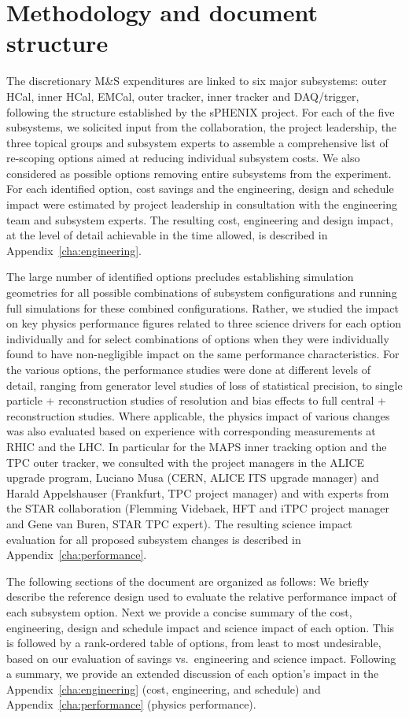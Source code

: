 \section{Methodology and document structure}

The discretionary M\&S expenditures are linked to six major
subsystems: outer HCal, inner HCal, EMCal, outer tracker, inner
tracker and DAQ/trigger, following the structure established by the
sPHENIX project. For each of the five subsystems, we solicited input
from the collaboration, the project leadership, the three topical
groups and subsystem experts to assemble a comprehensive list of
re-scoping options aimed at reducing individual subsystem costs.  We
also considered as possible options removing entire subsystems from
the experiment. For each identified option, cost savings and the
engineering, design and schedule impact were estimated by project
leadership in consultation with the engineering team and subsystem
experts. The resulting cost, engineering and design impact, at the
level of detail achievable in the time allowed, is described in
Appendix~\ref{cha:engineering}.

The large number of identified options precludes establishing
simulation geometries for all possible combinations of subsystem
configurations and running full \geant simulations for these combined
configurations. Rather, we studied the impact on key physics
performance figures related to three science drivers for each option
individually and for select combinations of options when they were
individually found to have non-negligible impact on the same
performance characteristics. For the various options, the performance
studies were done at different levels of detail, ranging from
generator level studies of loss of statistical precision, to single
particle \geant + reconstruction studies of resolution and bias
effects to full central \auau \hijing \geant + reconstruction
studies. Where applicable, the physics impact of various changes was
also evaluated based on experience with corresponding measurements at
RHIC and the LHC. In particular for the MAPS inner tracking option and
the TPC outer tracker, we consulted with the project managers in the
ALICE upgrade program, Luciano Musa (CERN, ALICE ITS upgrade manager)
and Harald Appelshauser (Frankfurt, TPC project manager) and with
experts from the STAR collaboration (Flemming Videbaek, HFT and iTPC
project manager and Gene van Buren, STAR TPC expert). The resulting
science impact evaluation for all proposed subsystem changes is
described in Appendix~\ref{cha:performance}.

The following sections of the document are organized as follows: We
briefly describe the reference design used to evaluate the relative
performance impact of each subsystem option. Next we provide a concise
summary of the cost, engineering, design and schedule impact and
science impact of each option. This is followed by a rank-ordered
table of options, from least to most undesirable, based on our
evaluation of savings vs.\ engineering and science impact. Following a
summary, we provide an extended discussion of each option's impact in
the Appendix~\ref{cha:engineering} (cost, engineering, and schedule)
and Appendix~\ref{cha:performance} (physics performance).


